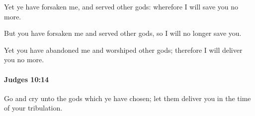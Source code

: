 			\begin{versebox}
					\item[BHS] 
					\item[ASV] Yet ye have forsaken me, and served other gods: wherefore I will save you no more.
					\item[NIV] But you have forsaken me and served other gods, so I will no longer save you.
					\item[NRSV] Yet you have abandoned me and worshiped other gods; therefore I will deliver you no more.
			\end{versebox}

		\paragraph{Judges 10:14} %
			\label{JUDGES-10-14}

			Go and cry unto the gods which ye have chosen; let them deliver you in the time of your tribulation.

